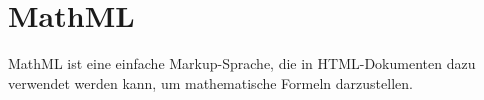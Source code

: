 \section{MathML}

MathML ist eine einfache Markup-Sprache, die in HTML-Dokumenten dazu verwendet werden kann, um mathematische Formeln darzustellen.